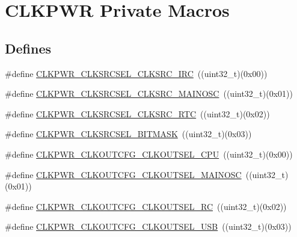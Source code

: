 \hypertarget{group___c_l_k_p_w_r___private___macros}{\section{\-C\-L\-K\-P\-W\-R \-Private \-Macros}
\label{group___c_l_k_p_w_r___private___macros}
}
\subsection*{\-Defines}
\begin{DoxyCompactItemize}
\item 
\#define \hyperlink{group___c_l_k_p_w_r___private___macros_ga17bbb33d14958fbed34f56543569761f}{\-C\-L\-K\-P\-W\-R\-\_\-\-C\-L\-K\-S\-R\-C\-S\-E\-L\-\_\-\-C\-L\-K\-S\-R\-C\-\_\-\-I\-R\-C}~((uint32\-\_\-t)(0x00))
\item 
\#define \hyperlink{group___c_l_k_p_w_r___private___macros_gad70f480a8a233255b43c7d267bc80e3c}{\-C\-L\-K\-P\-W\-R\-\_\-\-C\-L\-K\-S\-R\-C\-S\-E\-L\-\_\-\-C\-L\-K\-S\-R\-C\-\_\-\-M\-A\-I\-N\-O\-S\-C}~((uint32\-\_\-t)(0x01))
\item 
\#define \hyperlink{group___c_l_k_p_w_r___private___macros_gabd68dae444cd4872b7be3ebb892ea040}{\-C\-L\-K\-P\-W\-R\-\_\-\-C\-L\-K\-S\-R\-C\-S\-E\-L\-\_\-\-C\-L\-K\-S\-R\-C\-\_\-\-R\-T\-C}~((uint32\-\_\-t)(0x02))
\item 
\#define \hyperlink{group___c_l_k_p_w_r___private___macros_ga2c8c3a97560e3bccac1748705f248d3f}{\-C\-L\-K\-P\-W\-R\-\_\-\-C\-L\-K\-S\-R\-C\-S\-E\-L\-\_\-\-B\-I\-T\-M\-A\-S\-K}~((uint32\-\_\-t)(0x03))
\item 
\#define \hyperlink{group___c_l_k_p_w_r___private___macros_ga7980ec0f7e1a786891171aa2d8f7d5e7}{\-C\-L\-K\-P\-W\-R\-\_\-\-C\-L\-K\-O\-U\-T\-C\-F\-G\-\_\-\-C\-L\-K\-O\-U\-T\-S\-E\-L\-\_\-\-C\-P\-U}~((uint32\-\_\-t)(0x00))
\item 
\#define \hyperlink{group___c_l_k_p_w_r___private___macros_gafec039a8373541201b0390cc8112ae6a}{\-C\-L\-K\-P\-W\-R\-\_\-\-C\-L\-K\-O\-U\-T\-C\-F\-G\-\_\-\-C\-L\-K\-O\-U\-T\-S\-E\-L\-\_\-\-M\-A\-I\-N\-O\-S\-C}~((uint32\-\_\-t)(0x01))
\item 
\#define \hyperlink{group___c_l_k_p_w_r___private___macros_gafc6adc93d3c02aabd1f07a68f3117e6f}{\-C\-L\-K\-P\-W\-R\-\_\-\-C\-L\-K\-O\-U\-T\-C\-F\-G\-\_\-\-C\-L\-K\-O\-U\-T\-S\-E\-L\-\_\-\-R\-C}~((uint32\-\_\-t)(0x02))
\item 
\#define \hyperlink{group___c_l_k_p_w_r___private___macros_ga479124d29f76b3210575d1d691ba3f83}{\-C\-L\-K\-P\-W\-R\-\_\-\-C\-L\-K\-O\-U\-T\-C\-F\-G\-\_\-\-C\-L\-K\-O\-U\-T\-S\-E\-L\-\_\-\-U\-S\-B}~((uint32\-\_\-t)(0x03))

\end{DoxyCompactItemize}
